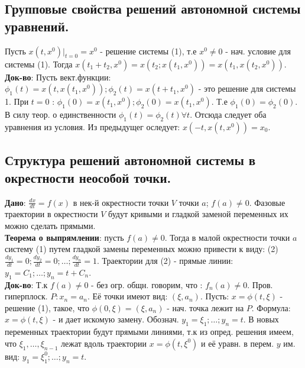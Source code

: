 \documentclass[unicode, 10pt, a4paper,oneside, landscape]{article}
\begin{document}
\begin{multicols}{4}

\subsection{Групповые свойства решений автономной системы уравнений.}

Пусть $x(t, x^0)|_{t=0} = x^0$ - решение системы (1), т.е $x^0 \neq 0$ - нач. условие для системы (1). Тогда $x(t_1 + t_2, x^0) = x(t_2; x(t_1, x^0)) = x(t_1, x(t_2, x^0)).$\\ 
{\bf Док-во}: Пусть вект.функции: $\phi_1(t) = x(t, x(t_1, x^0)); \phi_2(t) = x(t + t_1, x^0)$ - это решение для системы 1. При $t = 0$ : $\phi_1(0) = x(t_1, x^0); \phi_2(0) = x(t_1, x^0)$. Т.е $\phi_1(0) = \phi_2(0)$. В силу теор. о единственности $\phi_1(t) = \phi_2(t) \forall t$. Отсюда следует оба уравнения из условия. Из предыдущег оследует: $x(-t, x(t, x^0)) = x_0$.


\subsection{Структура решений автономной системы в окрестности неособой точки.}

{\bf Дано}: $\frac{dx}{dt} = f(x)$ в нек-й окрестности точки $V$  точки $a$; $f(a) \neq 0$. Фазовые траектории в окрестности $V$ будут кривыми и гладкой заменой переменных их можно сделать прямыми.\\
{\bf Теорема о выпрямлении}: пусть $f(a) \neq 0$. Тогда в малой окрестности точки $a$ систему (1) путем гладкой замены переменных можно привести к виду: (2) $\frac{dy_1}{dt} = 0; \frac{dy_2}{dt} = 0; \ldots; \frac{dy_n}{dt} = 1$. Траектории для (2) - прямые линии: $y_1 = C_1; \ldots; y_n = t+C_n$.\\
{\bf Док-во}: Т.к $f(a) \neq 0$ - без огр. общн. говорим, что : $f_n(a) \neq 0$. Пров. гиперплоск. $P : x_n = a_n$. Её точки имеют вид: $(\xi, a_n)$. Пусть: $x = \phi(t, \xi)$ - решение (1), такое, что $\phi(0, \xi) = (\xi, a_n)$ - нач. точка лежит на $P$. Формула: $x = \phi(t, \xi)$ - и дает искомую замену. Обознач. $y_1 = \xi_1; \ldots; y_n = t$. В новых переменных траектории будут прямыми линиями, т.к из опред. решения имеем, что $\xi_1,\ldots, \xi_{n-1}$ лежат вдоль траектории $x = \phi(t, \xi^0)$ и её уравн. в перем. $y$ им. вид: $y_1 = \xi_1^0; \ldots; y_n = t$.



\end{multicols}
\end{document}

